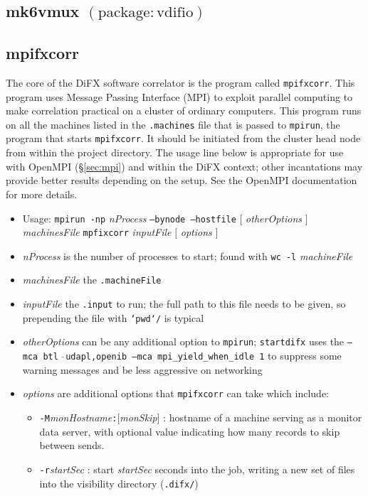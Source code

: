 
\subsection{mk6vmux {\small $\mathrm{(package: vdifio)}$}} \label{sec:mk6vmux} 





\subsection{mpifxcorr} \label{sec:mpifxcorr}

The core of the DiFX software correlator is the program called {\tt mpifxcorr}.
This program uses Message Passing Interface (MPI) to exploit parallel computing to make correlation practical on a cluster of ordinary computers.
This program runs on all the machines listed in the {\tt .machines} file that is passed to {\tt mpirun}, the program that starts {\tt mpifxcorr}.
It should be initiated from the cluster head node from within the project directory.
The usage line below is appropriate for use with OpenMPI (\S\ref{sec:mpi}) and within the DiFX context; other incantations may provide better results depending on the setup.
See the OpenMPI documentation for more details.

\begin{itemize}
\item[] Usage: {\tt mpirun -np} {\em nProcess} {\tt --bynode --hostfile} $[$ {\em otherOptions} $]$ {\em machinesFile} {\tt mpfixcorr} {\em inputFile} $[$ {\em options} $]$
\item[] {\em nProcess} is the number of processes to start; found with {\tt wc -l} {\em machineFile}
\item[] {\em machinesFile} the {\tt .machineFile}
\item[] {\em inputFile} the {\tt .input} to run; the full path to this file needs to be given, so prepending the file with {\tt `pwd`/} is typical
\item[] {\em otherOptions} can be any additional option to {\tt mpirun}; {\tt startdifx} uses the {\tt --mca btl $\hat{\ }$udapl,openib --mca mpi\_yield\_when\_idle 1} to suppress some warning messages and be less aggressive on networking
\item[] {\em options} are additional options that {\tt mpifxcorr} can take which include:
\begin{itemize}
\item[] {\tt -M}{\em monHostname}{\tt :}$[${\em monSkip}$]$ : hostname of a machine serving as a monitor data server, with optional value indicating how many records to skip between sends.
\item[] {\tt -r}{\em startSec} : start {\em startSec} seconds into the job, writing a new set of files into the visibility directory ({\tt .difx/})
\end{itemize}
\end{itemize}

